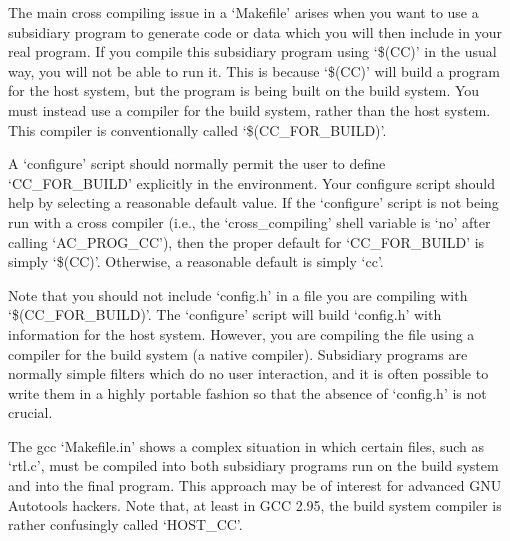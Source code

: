The main cross compiling issue in a `Makefile' arises when you want to use a subsidiary program to generate code or data which you will then include in your real program. If you compile this subsidiary program using `\$(CC)' in the usual way, you will not be able to run it. This is because `\$(CC)' will build a program for the host system, but the program is being built on the build system. You must instead use a compiler for the build system, rather than the host system. This compiler is conventionally called `\$(CC\_{}FOR\_{}BUILD)'.

A `configure' script should normally permit the user to define `CC\_{}FOR\_{}BUILD' explicitly in the environment. Your configure script should help by selecting a reasonable default value. If the `configure' script is not being run with a cross compiler (i.e., the `cross\_{}compiling' shell variable is `no' after calling `AC\_{}PROG\_{}CC'), then the proper default for `CC\_{}FOR\_{}BUILD' is simply `\$(CC)'. Otherwise, a reasonable default is simply `cc'.

Note that you should not include `config.h' in a file you are compiling 
with `\$(CC\_{}FOR\_{}BUILD)'. The `configure' script will build `config.h' with information for the host system. However, you are compiling the file using a compiler for the build system (a native compiler). Subsidiary programs are normally simple filters which do no user interaction, and it is often possible to write them in a highly portable fashion so that the absence of `config.h' is not crucial.

The gcc `Makefile.in' shows a complex situation in which certain files, such as `rtl.c', must be compiled into both subsidiary programs run on the build system and into the final program. This approach may be of interest for advanced GNU Autotools hackers. Note that, at least in GCC 2.95, the build system compiler is rather confusingly called `HOST\_{}CC'. 
